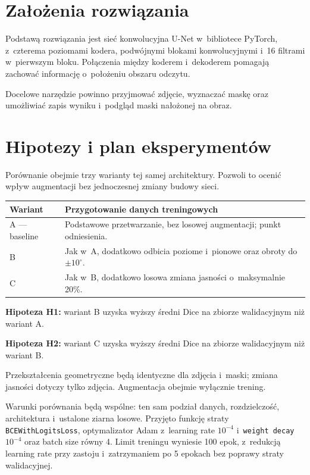 \documentclass[11pt,a4paper]{article}
\begin{document}
\section{Założenia rozwiązania}

Podstawą rozwiązania jest sieć konwolucyjna U-Net w~bibliotece PyTorch,
z~czterema poziomami kodera, podwójnymi blokami konwolucyjnymi i~16 filtrami
w~pierwszym bloku. Połączenia między koderem i~dekoderem pomagają zachować
informację o~położeniu obszaru odczytu.

Docelowe narzędzie powinno przyjmować zdjęcie, wyznaczać maskę oraz umożliwiać
zapis wyniku i~podgląd maski nałożonej na obraz.

\newpage

\section{Hipotezy i plan eksperymentów}

Porównanie obejmie trzy warianty tej samej architektury. Pozwoli to ocenić
wpływ augmentacji bez jednoczesnej zmiany budowy sieci.

\begin{center}
\renewcommand{\arraystretch}{1.18}
\begin{tabularx}{\linewidth}{@{}lY@{}}
\toprule
\textbf{Wariant} & \textbf{Przygotowanie danych treningowych} \\
\midrule
A — baseline & Podstawowe przetwarzanie, bez losowej augmentacji; punkt odniesienia. \\
B & Jak w~A, dodatkowo odbicia poziome i~pionowe oraz obroty do $\pm10^\circ$. \\
C & Jak w~B, dodatkowo losowa zmiana jasności o~maksymalnie 20\%. \\
\bottomrule
\end{tabularx}
\end{center}

\textbf{Hipoteza H1:} wariant B uzyska wyższy średni Dice na zbiorze
walidacyjnym niż wariant A.

\textbf{Hipoteza H2:} wariant C uzyska wyższy średni Dice na zbiorze
walidacyjnym niż wariant B.

Przekształcenia geometryczne będą identyczne dla zdjęcia i~maski;
zmiana jasności dotyczy tylko zdjęcia. Augmentacja obejmie wyłącznie trening.

Warunki porównania będą wspólne: ten sam podział danych, rozdzielczość,
architektura i~ustalone ziarna losowe. Przyjęto funkcję straty
\texttt{BCEWithLogitsLoss}, optymalizator Adam z~learning rate $10^{-4}$
i~\texttt{weight decay} $10^{-4}$ oraz batch size równy 4. Limit treningu
wyniesie 100 epok, z~redukcją learning rate przy zastoju i~zatrzymaniem
po 5 epokach bez poprawy straty walidacyjnej.
\end{document}
